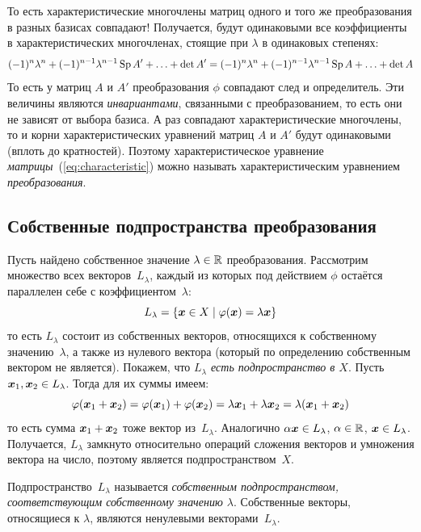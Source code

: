 \documentclass[a4paper,12pt]{article}
\begin{document}
  То есть характеристические многочлены матриц одного и того же преобразования в разных базисах совпадают!
  Получается, будут одинаковыми все коэффициенты в характеристических многочленах, стоящие при $\lambda$ в одинаковых степенях:
  \begin{equation*}
    (-1)^n \lambda^n + (-1)^{n-1} \lambda^{n-1} \operatorname{Sp} A' + \ldots + \det A'
      = (-1)^n \lambda^n + (-1)^{n-1} \lambda^{n-1} \operatorname{Sp} A + \ldots + \det A
  \end{equation*}
  То есть у матриц $A$ и $A'$ преобразования $\phi$ совпадают след и определитель.
  Эти величины являются \emph{инвариантами}, связанными с преобразованием, то есть они не зависят от выбора базиса.
  А раз совпадают характеристические многочлены, то и корни характеристических уравнений матриц $A$ и $A'$ будут одинаковыми (вплоть до кратностей).
  Поэтому характеристическое уравнение \emph{матрицы}~(\ref{eq:characteristic}) можно называть характеристическим уравнением \emph{преобразования}.
  
  
  \subsection{Собственные подпространства преобразования}
  
  Пусть найдено собственное значение $\lambda \hm\in \RR$ преобразования.
  Рассмотрим множество всех векторов~$L_{\lambda}$, каждый из которых под действием $\phi$ остаётся параллелен себе с коэффициентом~$\lambda$:
  \begin{equation}\label{eq:proper-subspace}
    L_{\lambda} = \{\boldsymbol x \in X \mid \varphi(\boldsymbol x) = \lambda \boldsymbol x\}
  \end{equation}
  то есть $L_{\lambda}$ состоит из собственных векторов, относящихся к собственному значению~$\lambda$, а также из нулевого вектора (который по определению собственным вектором не является).
  Покажем, что \emph{$L_{\lambda}$ есть подпространство в $X$}.
  Пусть $\bds x_1, \bds x_2 \hm\in L_{\lambda}$.
  Тогда для их суммы имеем:
  \[
    \varphi(\boldsymbol x_1 + \boldsymbol x_2) = \varphi(\boldsymbol x_1) + \varphi(\boldsymbol x_2) = \lambda \boldsymbol x_1 + \lambda \boldsymbol x_2 = \lambda (\boldsymbol x_1 + \boldsymbol x_2)
  \]
  то есть сумма $\bds x_1 \hm+ \bds x_2$ тоже вектор из~$L_{\lambda}$.
  Аналогично $\alpha \bds x \hm\in L_{\lambda}$, $\alpha \hm\in \RR$, $\bds x \hm\in L_{\lambda}$.
  Получается, $L_{\lambda}$ замкнуто относительно операций сложения векторов и умножения вектора на число, поэтому является подпространством~$X$.
  
  Подпространство~$L_{\lambda}$ называется \emph{собственным подпространством, соответствующим собственному значению $\lambda$}.
  Собственные векторы, относящиеся к $\lambda$, являются ненулевыми векторами~$L_{\lambda}$.
  
\end{document}
